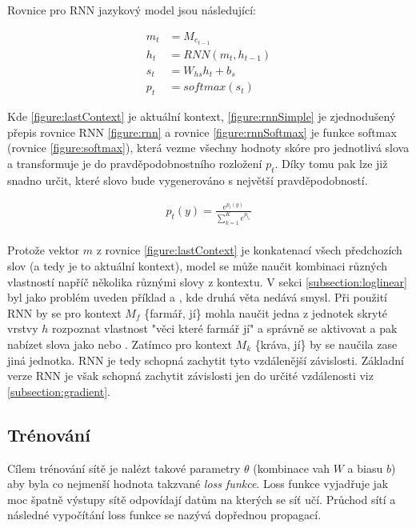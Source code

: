 Rovnice pro RNN jazykový model jsou následující:

\begin{align}
  m_{t}&=M_{e_{t-1}}\label{figure:lastContext} \\
  h_{t}&=RNN(m_t, h_{t-1}) \label{figure:rnnSimple} \\
  s_{t}&=W_{hs}h_t + b_s \label{figure:rnnSt} \\
  p_{t}&=softmax(s_t) \label{figure:rnnSoftmax}
\end{align}


Kde \ref{figure:lastContext} je aktuální kontext, \ref{figure:rnnSimple} je zjednodušený přepis rovnice RNN \ref{figure:rnn} a rovnice \ref{figure:rnnSoftmax} je funkce softmax (rovnice \ref{figure:softmax}), která vezme všechny hodnoty skóre pro jednotlivá slova a transformuje je do pravděpodobnostního rozložení $p_t$. Díky tomu pak lze již snadno určit, které slovo bude vygenerováno s největší pravděpodobností.


\begin{align}\label{figure:softmax}
  p_t(y)={\frac {e^{p_{t}(y)}}{\sum _{k=1}^{K}e^{p_{t_{k}}}}}
\end{align}
\\


Protože vektor $m$ z rovnice \ref{figure:lastContext} je konkatenací všech předchozích slov (a tedy je to aktuální kontext), model se může naučit kombinaci různých vlastností napříč několika různými slovy z kontextu. V sekci \ref{subsection:loglinear} byl jako problém uveden příklad  a , kde druhá věta nedává smysl. Při použití RNN by se pro kontext $M_f$  \{farmář, jí\} mohla naučit jedna z jednotek skryté vrstvy $h$ rozpoznat vlastnost "věci které farmář jí" a správně se aktivovat a pak nabízet slova jako  nebo . Zatímco pro kontext $M_k$ \{kráva, jí\} by se naučila zase jiná jednotka. RNN je tedy schopná zachytit tyto vzdálenější závislosti. Základní verze RNN je však schopná zachytit závislosti jen do určité vzdálenosti viz \ref{subsection:gradient}.


\subsection{Trénování} \label{subsection:training}
Cílem trénování sítě je nalézt takové parametry $\theta$ (kombinace vah $W$ a biasu $b$) aby byla co nejmenší hodnota takzvané \emph{loss funkce}. Loss funkce vyjadřuje jak moc špatně výstupy sítě odpovídají datům na kterých se síť učí. Průchod sítí a následné vypočítání loss funkce se nazývá dopřednou propagací.


